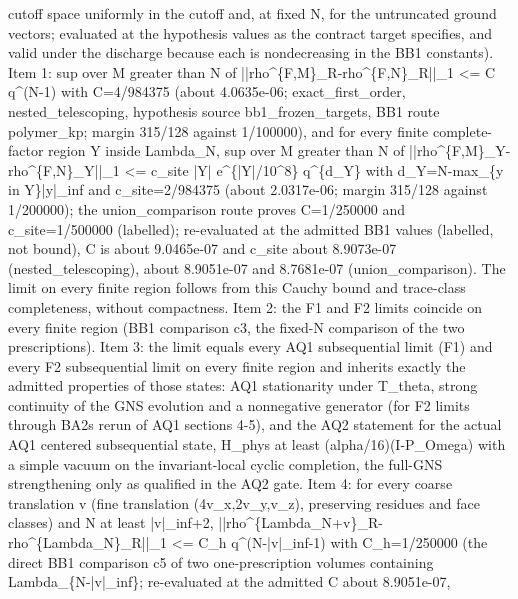 \begin{gatequote}
cutoff space uniformly in the cutoff and, at fixed N, for the untruncated
ground vectors; evaluated at the hypothesis values as the contract target
specifies, and valid under the discharge because each is nondecreasing in the
BB1 constants). Item 1: sup over M greater than N of
||rho\textasciicircum{}\{F,M\}\_R-rho\textasciicircum{}\{F,N\}\_R||\_1 <=
C\textquotesingle{} q\textasciicircum{}(N-1) with C\textquotesingle{}=4/984375
(about 4.0635e-06; exact\_first\_order, nested\_telescoping, hypothesis source
bb1\_frozen\_targets, BB1 route polymer\_kp; margin 315/128 against 1/100000),
and for every finite complete-factor region Y inside Lambda\_N, sup over M
greater than N of
||rho\textasciicircum{}\{F,M\}\_Y-rho\textasciicircum{}\{F,N\}\_Y||\_1 <=
c\textquotesingle{}\_site |Y| e\textasciicircum{}\{|Y|/10\textasciicircum{}8\}
q\textasciicircum{}\{d\_Y\} with d\_Y=N-max\_\{y in Y\}|y|\_inf and
c\textquotesingle{}\_site=2/984375 (about 2.0317e-06; margin 315/128 against
1/200000); the union\_comparison route proves C\textquotesingle{}=1/250000 and
c\textquotesingle{}\_site=1/500000 (labelled); re-evaluated at the admitted
BB1 values (labelled, not bound), C\textquotesingle{} is about 9.0465e-07 and
c\textquotesingle{}\_site about 8.9073e-07 (nested\_telescoping), about
8.9051e-07 and 8.7681e-07 (union\_comparison). The limit on every finite
region follows from this Cauchy bound and trace-class completeness, without
compactness. Item 2: the F1 and F2 limits coincide on every finite region (BB1
comparison c3, the fixed-N comparison of the two prescriptions). Item 3: the
limit equals every AQ1 subsequential limit (F1) and every F2 subsequential
limit on every finite region and inherits exactly the admitted properties of
those states: AQ1 stationarity under T\_theta, strong continuity of the GNS
evolution and a nonnegative generator (for F2 limits through
BA2\textquotesingle{}s rerun of AQ1 sections 4-5), and the AQ2 statement for
the actual AQ1 centered subsequential state, H\_phys at least
(alpha/16)(I-P\_Omega) with a simple vacuum on the invariant-local cyclic
completion, the full-GNS strengthening only as qualified in the AQ2 gate. Item
4: for every coarse translation v (fine translation (4v\_x,2v\_y,v\_z),
preserving residues and face classes) and N at least |v|\_inf+2,
||rho\textasciicircum{}\{Lambda\_N+v\}\_R-rho\textasciicircum{}\{Lambda\_N\}\_R||\_1
<= C\_h q\textasciicircum{}(N-|v|\_inf-1) with C\_h=1/250000 (the direct BB1
comparison c5 of two one-prescription volumes containing
Lambda\_\{N-|v|\_inf\}; re-evaluated at the admitted C about 8.9051e-07,

\end{gatequote}
